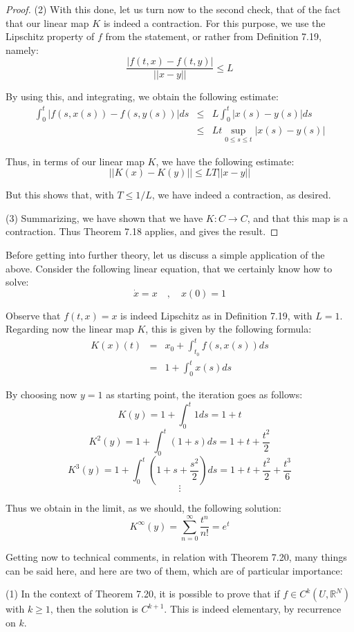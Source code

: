 \documentclass[12pt]{amsbook}
\begin{document}
\begin{proof}
(2) With this done, let us turn now to the second check, that of the fact that our linear map $K$ is indeed a contraction. For this purpose, we use the Lipschitz property of $f$ from the statement, or rather from Definition 7.19, namely:
$$\frac{|f(t,x)-f(t,y)|}{||x-y||}\leq L$$

By using this, and integrating, we obtain the following estimate:
\begin{eqnarray*}
\int_0^t|f(s,x(s))-f(s,y(s))|ds
&\leq&L\int_0^t|x(s)-y(s)|ds\\
&\leq&Lt\sup_{0\leq s\leq t}|x(s)-y(s)|
\end{eqnarray*}

Thus, in terms of our linear map $K$, we have the following estimate:
$$||K(x)-K(y)||\leq LT||x-y||$$

But this shows that, with $T\leq 1/L$, we have indeed a contraction, as desired.

\medskip

(3) Summarizing, we have shown that we have $K:C\to C$, and that this map is a contraction. Thus Theorem 7.18 applies, and gives the result.
\end{proof}

Before getting into further theory, let us discuss a simple application of the above. Consider the following linear equation, that we certainly know how to solve:
$$\dot{x}=x\quad,\quad x(0)=1$$

Observe that $f(t,x)=x$ is indeed Lipschitz as in Definition 7.19, with $L=1$. Regarding now the linear map $K$, this is given by the following formula:
\begin{eqnarray*}
K(x)(t)
&=&x_0+\int_{t_0}^tf(s,x(s))ds\\
&=&1+\int_0^tx(s)ds
\end{eqnarray*}

By choosing now $y=1$ as starting point, the iteration goes as follows:
$$K(y)=1+\int_0^t1ds=1+t$$
$$K^2(y)=1+\int_0^t(1+s)ds=1+t+\frac{t^2}{2}$$
$$K^3(y)=1+\int_0^t\left(1+s+\frac{s^2}{2}\right)ds=1+t+\frac{t^2}{2}+\frac{t^3}{6}$$
$$\vdots$$

Thus we obtain in the limit, as we should, the following solution:
$$K^\infty(y)=\sum_{n=0}^\infty\frac{t^n}{n!}=e^t$$

Getting now to technical comments, in relation with Theorem 7.20, many things can be said here, and here are two of them, which are of particular importance:

\bigskip

(1) In the context of Theorem 7.20, it is possible to prove that if $f\in C^k(U,\mathbb R^N)$ with $k\geq1$, then the solution is $C^{k+1}$. This is indeed elementary, by recurrence on $k$.
\end{document}
